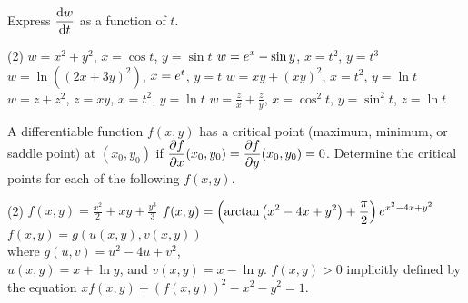 \documentclass{discussion}
\author{Sections B04 and B06}
\date{Fall 2024}
\begin{document}
\begin{question}
    Express \(\displaystyle \odv{w}{t}\) as a function of \(t\).
    \begin{tasks}(2)
        \task \(\displaystyle w = x^2 + y^2\), \(x = \cos t\), \(y = \sin t\)
        \task \(\displaystyle w = e^{x} - \sin y\), \(x = t^2\), \(y = t^3\)
        \task \(\displaystyle w = \ln ((2x + 3y)^2)\), \(x = e^{t}\), \(y = t\)
        \task \(\displaystyle w = xy + (xy)^2\), \(x = t^2\), \(y = \ln t\)
        \task \(\displaystyle w = z + z^2\), \(z = xy\), \(x = t^2\), \(y = \ln t\)
        \task \(\displaystyle w = \frac{z}{x} + \frac{z}{y}\), \(x = \cos^2 t\), \(y = \sin^2 t\), \(z = \ln t\)
    \end{tasks}
\end{question}

\vspace{60pt}


\begin{question}
    A differentiable function \(f(x, y)\) has a critical point (maximum, minimum, or saddle point) at \((x_0, y_0)\) if \(\displaystyle \pdv{f}{x}(x_0, y_0) = \pdv{f}{y}(x_0, y_0) = 0\).
    Determine the critical points for each of the following \(f(x, y)\).
    \begin{tasks}(2)
        \task \(\displaystyle f(x, y) = \frac{x^2}{2} + xy + \frac{y^3}{3}\)
        \task \(\displaystyle f(x, y) = \left( \arctan\left( x^2 - 4x + y^2 \right) + \frac{\pi}{2} \right) e^{x^2 - 4x + y^2}\)
        \task \(f(x, y) = g(u(x, y), v(x, y))\) \\
        where \(g(u, v) = u^2 - 4u + v^2\), \\
        \(u(x, y) = x + \ln y\), and \(v(x, y) = x - \ln y\).
        \task \(f(x, y) > 0\) implicitly defined by the equation \(\displaystyle x f(x,y) + (f(x, y))^2 - x^2 - y^2 = 1\).
    \end{tasks}
\end{question}




\end{document}
